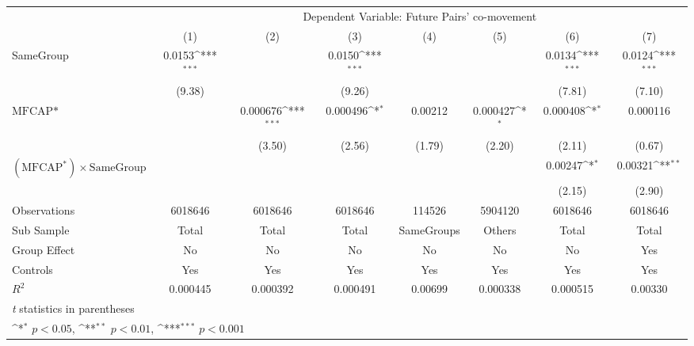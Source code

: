 {
\def\sym#1{\ifmmode^{#1}\else\(^{#1}\)\fi}
\begin{tabular}{l*{7}{c}}
\hline\hline
                &\multicolumn{7}{c}{Dependent Variable: Future Pairs' co-movement}                                                                   \\\cmidrule(lr){2-8}
                &\multicolumn{1}{c}{(1)}         &\multicolumn{1}{c}{(2)}         &\multicolumn{1}{c}{(3)}         &\multicolumn{1}{c}{(4)}         &\multicolumn{1}{c}{(5)}         &\multicolumn{1}{c}{(6)}         &\multicolumn{1}{c}{(7)}         \\
\hline
SameGroup       &   0.0153\sym{***}&                  &   0.0150\sym{***}&                  &                  &   0.0134\sym{***}&   0.0124\sym{***}\\
                &   (9.38)         &                  &   (9.26)         &                  &                  &   (7.81)         &   (7.10)         \\
[1em]
$ \text{MFCAP*} $&                  & 0.000676\sym{***}& 0.000496\sym{*}  &  0.00212         & 0.000427\sym{*}  & 0.000408\sym{*}  & 0.000116         \\
                &                  &   (3.50)         &   (2.56)         &   (1.79)         &   (2.20)         &   (2.11)         &   (0.67)         \\
[1em]
 $ (\text{MFCAP}^*) \times {\text{SameGroup} }  $ &                  &                  &                  &                  &                  &  0.00247\sym{*}  &  0.00321\sym{**} \\
                &                  &                  &                  &                  &                  &   (2.15)         &   (2.90)         \\
\hline
Observations    &  6018646         &  6018646         &  6018646         &   114526         &  5904120         &  6018646         &  6018646         \\
Sub Sample      &    Total         &    Total         &    Total         &SameGroups         &   Others         &    Total         &    Total         \\
Group Effect    &       No         &       No         &       No         &       No         &       No         &       No         &      Yes         \\
Controls        &      Yes         &      Yes         &      Yes         &      Yes         &      Yes         &      Yes         &      Yes         \\
$ R^2 $         & 0.000445         & 0.000392         & 0.000491         &  0.00699         & 0.000338         & 0.000515         &  0.00330         \\
\hline\hline
\multicolumn{8}{l}{\footnotesize \textit{t} statistics in parentheses}\\
\multicolumn{8}{l}{\footnotesize \sym{*} \(p<0.05\), \sym{**} \(p<0.01\), \sym{***} \(p<0.001\)}\\
\end{tabular}
}
